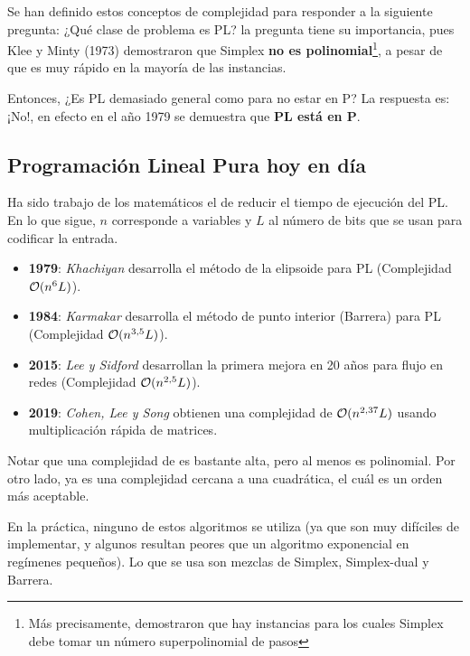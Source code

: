 Se han definido estos conceptos de complejidad para responder a la siguiente pregunta: ¿Qué clase de problema es PL? la pregunta tiene su importancia, pues Klee y Minty (1973) demostraron que Simplex \textbf{no es polinomial}\footnote{Más precisamente, demostraron que hay instancias para los cuales Simplex debe tomar un número superpolinomial de pasos}, a pesar de que es muy rápido en la mayoría de las instancias.

Entonces, ¿Es PL demasiado general como para no estar en P? La respuesta es: ¡No!, en efecto en el año 1979 se demuestra que \textbf{PL está en P}.

\subsection*{Programación Lineal Pura hoy en día}
Ha sido trabajo de los matemáticos el de reducir el tiempo de ejecución del PL. En lo que sigue, $n$ corresponde a variables y $L$ al número de bits que se usan para codificar la entrada.
\begin{itemize}
    \item \textbf{1979}: \textit{Khachiyan} desarrolla el método de la elipsoide para PL (Complejidad $\Ord[n^6L]$).
    \item \textbf{1984}: \textit{Karmakar} desarrolla el método de punto interior (Barrera) para PL (Complejidad $\Ord[n^{3,5}L]$).
    \item \textbf{2015}: \textit{Lee y Sidford} desarrollan la primera mejora en 20 años para flujo en redes (Complejidad $\Ord[n^{2,5}L]$).
    \item \textbf{2019}: \textit{Cohen, Lee y Song} obtienen una complejidad de $\Ord[n^{2,37}L]$ usando multiplicación rápida de matrices.
\end{itemize}

\begin{obs}
Notar que una complejidad de \Ord[n^6 L] es bastante alta, pero al menos es polinomial. Por otro lado, \Ord[n^{2,37} L] ya es una complejidad cercana a una cuadrática, el cuál es un orden más aceptable.
\end{obs}

\begin{obs}
En la práctica, ninguno de estos algoritmos se utiliza (ya que son muy difíciles de implementar, y algunos resultan peores que un algoritmo exponencial en regímenes pequeños). Lo que se usa son mezclas de Simplex, Simplex-dual y Barrera.
\end{obs}


